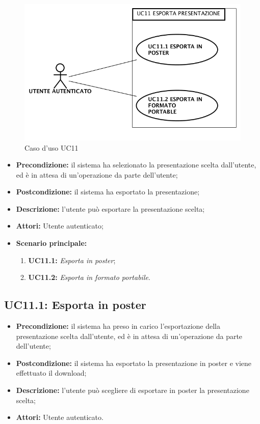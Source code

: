 \begin{figure}[h]
	\begin{center}
	\includegraphics[scale=0.4]{diagram/UC11.png}
	\caption{Caso d'uso UC11}
	\end{center}
\end{figure}
\begin{itemize}
	\item \textbf{Precondizione:} il sistema ha selezionato la presentazione scelta dall'utente, ed è in attesa di un'operazione da parte dell'utente;
	\item \textbf{Postcondizione:} il sistema ha esportato la presentazione;
	\item \textbf{Descrizione:} l'utente può esportare la presentazione scelta;
	\item \textbf{Attori:} Utente autenticato;
	\item \textbf{Scenario principale:}
	\begin{enumerate}
		\item \textbf{ UC11.1:} \textit{ Esporta in poster};
		\item \textbf{ UC11.2:} \textit{ Esporta in formato portabile}.
	\end{enumerate}
\end{itemize}
\subsection{ UC11.1: Esporta in poster}

\begin{itemize}
	\item \textbf{Precondizione:} il sistema ha preso in carico l'esportazione della presentazione scelta dall'utente, ed è in attesa di un'operazione da parte dell'utente;
	\item \textbf{Postcondizione:} il sistema ha esportato la presentazione in poster e viene effettuato il download;
	\item \textbf{Descrizione:} l'utente può scegliere di esportare in poster la presentazione scelta;
	\item \textbf{Attori:} Utente autenticato.
\end{itemize}
